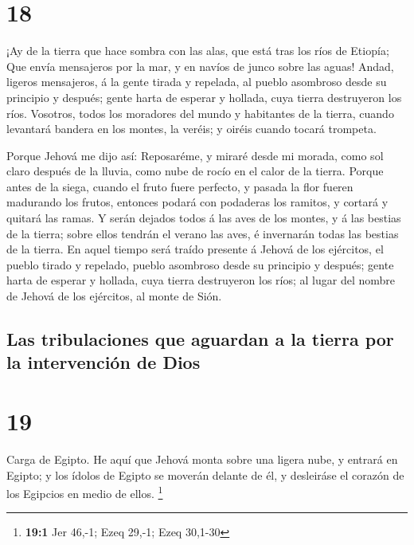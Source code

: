 \hypertarget{section-17}{%
\section{18}\label{section-17}}

 ¡Ay de la tierra que hace sombra con las alas, que está
tras los ríos de Etiopía;  Que envía mensajeros por la
mar, y en navíos de junco sobre las aguas! Andad, ligeros mensajeros, á
la gente tirada y repelada, al pueblo asombroso desde su principio y
después; gente harta de esperar y hollada, cuya tierra destruyeron los
ríos.  Vosotros, todos los moradores del mundo y
habitantes de la tierra, cuando levantará bandera en los montes, la
veréis; y oiréis cuando tocará trompeta.

 Porque Jehová me dijo así: Reposaréme, y miraré desde mi
morada, como sol claro después de la lluvia, como nube de rocío en el
calor de la tierra.  Porque antes de la siega, cuando el
fruto fuere perfecto, y pasada la flor fueren madurando los frutos,
entonces podará con podaderas los ramitos, y cortará y quitará las
ramas.  Y serán dejados todos á las aves de los montes, y
á las bestias de la tierra; sobre ellos tendrán el verano las aves, é
invernarán todas las bestias de la tierra.  En aquel
tiempo será traído presente á Jehová de los ejércitos, el pueblo tirado
y repelado, pueblo asombroso desde su principio y después; gente harta
de esperar y hollada, cuya tierra destruyeron los ríos; al lugar del
nombre de Jehová de los ejércitos, al monte de Sión.

\hypertarget{las-tribulaciones-que-aguardan-a-la-tierra-por-la-intervenciuxf3n-de-dios}{%
\subsection{Las tribulaciones que aguardan a la tierra por la
intervención de
Dios}\label{las-tribulaciones-que-aguardan-a-la-tierra-por-la-intervenciuxf3n-de-dios}}

\hypertarget{section-18}{%
\section{19}\label{section-18}}

 Carga de Egipto. He aquí que Jehová monta sobre una
ligera nube, y entrará en Egipto; y los ídolos de Egipto se moverán
delante de él, y desleiráse el corazón de los Egipcios en medio de
ellos. \footnote{\textbf{19:1} Jer 46,-1; Ezeq 29,-1; Ezeq 30,1-30}

